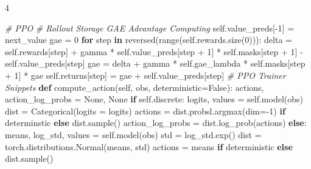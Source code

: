\documentclass{article}
\newenvironment{Shaded}{\CodeFontSize\setlength{\topsep}{\CodeBlockSkip}\setlength{\partopsep}{0pt}}{}
\newcommand{\BuiltInTok}[1]{\textcolor[rgb]{0.00,0.50,0.00}{#1}}
\newcommand{\CommentTok}[1]{\textcolor[rgb]{0.38,0.63,0.69}{\textit{#1}}}
\newcommand{\ControlFlowTok}[1]{\textcolor[rgb]{0.00,0.44,0.13}{\textbf{#1}}}
\newcommand{\DecValTok}[1]{\textcolor[rgb]{0.25,0.63,0.44}{#1}}
\newcommand{\KeywordTok}[1]{\textcolor[rgb]{0.00,0.44,0.13}{\textbf{#1}}}
\newcommand{\NormalTok}[1]{#1}
\newcommand{\OperatorTok}[1]{\textcolor[rgb]{0.40,0.40,0.40}{#1}}
\newcommand{\VariableTok}[1]{\textcolor[rgb]{0.10,0.09,0.49}{#1}}
\newcommand{\CodeFontSize}{\fontsize{3.6}{4}\selectfont}
\newlength{\CodeBlockSkip}
\newcommand{\NumCodeColumns}{4}  %
\begin{document}
\begin{multicols*}{\NumCodeColumns}
\begin{Shaded}
\begin{Highlighting}[]
\CommentTok{\# PPO}
\CommentTok{\# Rollout Storage GAE Advantage Computing}
\VariableTok{self}\NormalTok{.value\_preds[}\OperatorTok{{-}}\DecValTok{1}\NormalTok{] }\OperatorTok{=}\NormalTok{ next\_value}
\NormalTok{gae }\OperatorTok{=} \DecValTok{0}
\ControlFlowTok{for}\NormalTok{ step }\KeywordTok{in} \BuiltInTok{reversed}\NormalTok{(}\BuiltInTok{range}\NormalTok{(}\VariableTok{self}\NormalTok{.rewards.size(}\DecValTok{0}\NormalTok{))):}
\NormalTok{  delta }\OperatorTok{=} \VariableTok{self}\NormalTok{.rewards[step] }\OperatorTok{+}\NormalTok{ gamma }\OperatorTok{*} \VariableTok{self}\NormalTok{.value\_preds[step }\OperatorTok{+} \DecValTok{1}\NormalTok{] }\OperatorTok{*} \VariableTok{self}\NormalTok{.masks[step }\OperatorTok{+} \DecValTok{1}\NormalTok{] }\OperatorTok{{-}} \VariableTok{self}\NormalTok{.value\_preds[step]}
\NormalTok{  gae }\OperatorTok{=}\NormalTok{ delta }\OperatorTok{+}\NormalTok{ gamma }\OperatorTok{*} \VariableTok{self}\NormalTok{.gae\_lambda }\OperatorTok{*} \VariableTok{self}\NormalTok{.masks[step }\OperatorTok{+} \DecValTok{1}\NormalTok{] }\OperatorTok{*}\NormalTok{ gae}
  \VariableTok{self}\NormalTok{.returns[step] }\OperatorTok{=}\NormalTok{ gae }\OperatorTok{+} \VariableTok{self}\NormalTok{.value\_preds[step]}
\CommentTok{\# PPO Trainer Snippets}
\KeywordTok{def}\NormalTok{ compute\_action(}\VariableTok{self}\NormalTok{, obs, deterministic}\OperatorTok{=}\VariableTok{False}\NormalTok{):}
\NormalTok{  actions, action\_log\_probs }\OperatorTok{=} \VariableTok{None}\NormalTok{, }\VariableTok{None}
  \ControlFlowTok{if} \VariableTok{self}\NormalTok{.discrete:}
\NormalTok{    logits, values }\OperatorTok{=} \VariableTok{self}\NormalTok{.model(obs)}
\NormalTok{    dist }\OperatorTok{=}\NormalTok{ Categorical(logits }\OperatorTok{=}\NormalTok{ logits)}
\NormalTok{    actions }\OperatorTok{=}\NormalTok{ dist.probsl.argmax(dim}\OperatorTok{={-}}\DecValTok{1}\NormalTok{) }\ControlFlowTok{if}\NormalTok{ determinstic }\ControlFlowTok{else}\NormalTok{ dist.sample()}
\NormalTok{    action\_log\_probs }\OperatorTok{=}\NormalTok{ dist.log\_prob(actions)}
  \ControlFlowTok{else}\NormalTok{:}
\NormalTok{    means, log\_std, values }\OperatorTok{=} \VariableTok{self}\NormalTok{.model(obs)}
\NormalTok{    std }\OperatorTok{=}\NormalTok{ log\_std.exp()}
\NormalTok{    dist }\OperatorTok{=}\NormalTok{ torch.distributions.Normal(means, std)}
\NormalTok{    actions }\OperatorTok{=}\NormalTok{ means }\ControlFlowTok{if}\NormalTok{ deterministic }\ControlFlowTok{else}\NormalTok{ dist.sample()}

\end{Highlighting}
\end{Shaded}
\end{multicols*}
\end{document}
